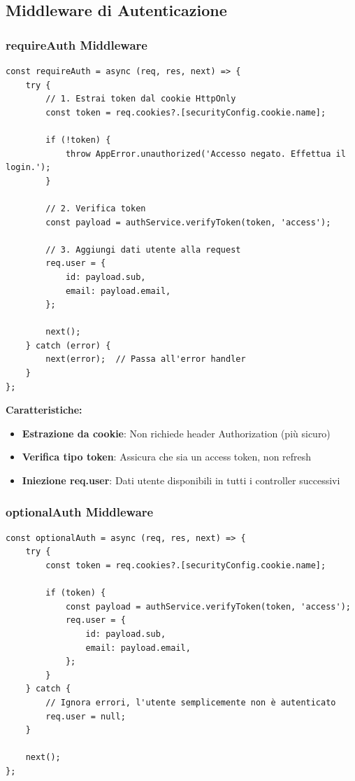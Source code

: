 \documentclass[11pt,a4paper]{article}
\begin{document}
\subsection{Middleware di Autenticazione}

\subsubsection{requireAuth Middleware}

\begin{lstlisting}[caption=Middleware Require Auth]
const requireAuth = async (req, res, next) => {
    try {
        // 1. Estrai token dal cookie HttpOnly
        const token = req.cookies?.[securityConfig.cookie.name];

        if (!token) {
            throw AppError.unauthorized('Accesso negato. Effettua il login.');
        }

        // 2. Verifica token
        const payload = authService.verifyToken(token, 'access');

        // 3. Aggiungi dati utente alla request
        req.user = {
            id: payload.sub,
            email: payload.email,
        };

        next();
    } catch (error) {
        next(error);  // Passa all'error handler
    }
};
\end{lstlisting}

\textbf{Caratteristiche:}
\begin{itemize}
    \item \textbf{Estrazione da cookie}: Non richiede header Authorization (più sicuro)
    \item \textbf{Verifica tipo token}: Assicura che sia un access token, non refresh
    \item \textbf{Iniezione req.user}: Dati utente disponibili in tutti i controller successivi
\end{itemize}

\subsubsection{optionalAuth Middleware}

\begin{lstlisting}[caption=Middleware Optional Auth]
const optionalAuth = async (req, res, next) => {
    try {
        const token = req.cookies?.[securityConfig.cookie.name];

        if (token) {
            const payload = authService.verifyToken(token, 'access');
            req.user = {
                id: payload.sub,
                email: payload.email,
            };
        }
    } catch {
        // Ignora errori, l'utente semplicemente non è autenticato
        req.user = null;
    }

    next();
};
\end{lstlisting}
\end{document}
